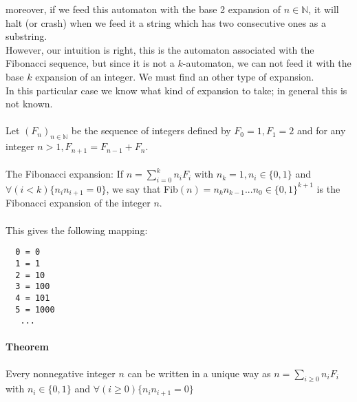 \documentclass{article}
\begin{document}
moreover, if we feed this automaton with the base 2 expansion of
$n \in \mathbb{N}$, it will halt (or crash) when we feed it a string which has
two consecutive ones as a substring.\\
However, our intuition is right, this is the automaton associated with the
Fibonacci sequence, but since it is not a $k$-automaton, we can not feed it
with the base $k$ expansion of an integer. We must find an other type of
expansion.\\
In this particular case we know what kind of expansion to take; in general this
is not known.\\
\\
Let $(F_n)_{n \in \mathbb{N}}$ be the sequence of integers defined by $F_0 = 1,
F_1 = 2$ and for any integer $n > 1, F_{n + 1} = F_{n - 1} + F_n$.\\
\\
The Fibonacci expansion: If $n = \sum_{i = 0}^k n_i F_i$ with
$n_k = 1, n_i \in \{0, 1\}$ and $\forall (i < k) \{n_i n_{i + 1} = 0\}$, we
say that Fib$(n) = n_k n_{k - 1} ... n_0 \in \{0, 1\}^{k + 1}$ is the
Fibonacci expansion of the integer $n$.\\
\\
This gives the following mapping:
\begin{verbatim}
  0 = 0
  1 = 1
  2 = 10
  3 = 100
  4 = 101
  5 = 1000
   ...
\end{verbatim}

\paragraph{Theorem}
Every nonnegative integer $n$ can be written in a unique way as
$n = \sum_{i \ge 0} n_i F_i$ with $n_i \in \{0, 1\}$ and
$\forall (i \ge 0) \{n_i n_{i + 1} = 0\}$
\end{document}
